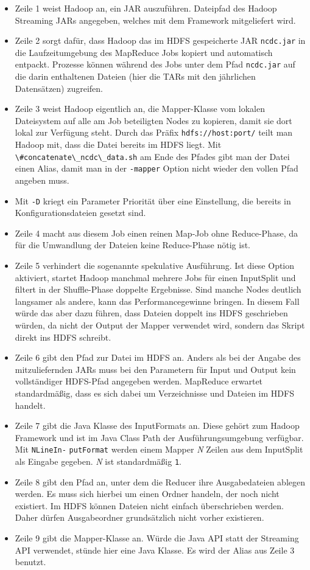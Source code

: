 \begin{itemize}
    \item Zeile 1 weist Hadoop an, ein JAR auszuführen. Dateipfad des Hadoop Streaming JARs angegeben, welches mit dem Framework mitgeliefert wird.
    \item Zeile 2 sorgt dafür, dass Hadoop das im HDFS gespeicherte JAR \verb|ncdc.jar| in die Laufzeitumgebung des MapReduce Jobs kopiert und automatisch entpackt. Prozesse können während des Jobs unter dem Pfad \verb|ncdc.jar| auf die darin enthaltenen Dateien (hier die TARs mit den jährlichen Datensätzen) zugreifen.
    \item Zeile 3 weist Hadoop eigentlich an, die Mapper-Klasse vom lokalen Dateisystem auf alle am Job beteiligten Nodes zu kopieren, damit sie dort lokal zur Verfügung steht. Durch das Präfix \verb|hdfs://host:port/| teilt man Hadoop mit, dass die Datei bereits im HDFS liegt. Mit \verb|\#concatenate\_ncdc\_data.sh| am Ende des Pfades gibt man der Datei einen Alias, damit man in der \verb|-mapper| Option nicht wieder den vollen Pfad angeben muss.      
    \item Mit \verb|-D| kriegt ein Parameter Priorität über eine Einstellung, die bereits in Konfigurationsdateien gesetzt sind.
    \item Zeile 4 macht aus diesem Job einen reinen Map-Job ohne Reduce-Phase, da für die Umwandlung der Dateien keine Reduce-Phase nötig ist.
    \item Zeile 5 verhindert die sogenannte spekulative Ausführung. Ist diese Option aktiviert, startet Hadoop manchmal mehrere Jobs für einen InputSplit und filtert in der Shuffle-Phase doppelte Ergebnisse. Sind manche Nodes deutlich langsamer als andere, kann das Performancegewinne bringen. In diesem Fall würde das aber dazu führen, dass Dateien doppelt ins HDFS geschrieben würden, da nicht der Output der Mapper verwendet wird, sondern das Skript direkt ins HDFS schreibt.
    \item Zeile 6 gibt den Pfad zur Datei im HDFS an. Anders als bei der Angabe des mitzuliefernden JARs muss bei den Parametern für Input und Output kein vollständiger HDFS-Pfad angegeben werden. MapReduce erwartet standardmäßig, dass es sich dabei um Verzeichnisse und Dateien im HDFS handelt.
    \item Zeile 7 gibt die Java Klasse des InputFormats an. Diese gehört zum Hadoop Framework und ist im Java Class Path der Ausführungsumgebung verfügbar. Mit \verb|NLineIn-| \verb|putFormat| werden einem Mapper \textit{N} Zeilen aus dem InputSplit als Eingabe gegeben. \textit{N} ist standardmäßig \verb|1|. 
    \item Zeile 8 gibt den Pfad an, unter dem die Reducer ihre Ausgabedateien ablegen werden. Es muss sich hierbei um einen Ordner handeln, der noch nicht existiert. Im HDFS können Dateien nicht einfach überschrieben werden. Daher dürfen Ausgabeordner grundsätzlich nicht vorher existieren.
    \item Zeile 9 gibt die Mapper-Klasse an. Würde die Java API statt der Streaming API verwendet, stünde hier eine Java Klasse. Es wird der Alias aus Zeile 3 benutzt.
\end{itemize}


